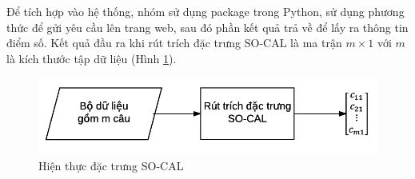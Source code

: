 Để tích hợp vào hệ thống, nhóm sử dụng package  trong Python, sử dụng phương thức  để gửi yêu cầu lên trang web, sau đó  phần kết quả trả về để lấy ra thông tin điểm số. Kết quả đầu ra khi rút trích đặc trưng SO-CAL là ma trận $m \times 1$ với $m$ là kích thước tập dữ liệu (Hình \ref{fig:hien-thuc-socal}).
\begin{figure}[h]
\centering
\includegraphics[scale=0.7]{../hinh/hien_thuc_socal.png}
\caption{Hiện thực đặc trưng SO-CAL} \label{fig:hien-thuc-socal}
\end{figure}
